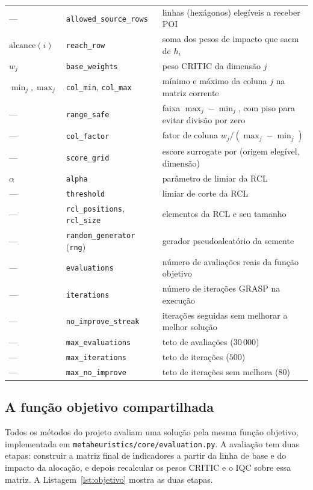\documentclass[11pt,a4paper]{article}
\newcommand{\code}[1]{\texttt{#1}}
\begin{document}
\begin{longtable}{@{}p{2.4cm} p{4.2cm} p{7.6cm}@{}}
--- & \code{allowed\_source\_rows} & linhas (hexágonos) elegíveis a receber POI \\
$\text{alcance}(i)$ & \code{reach\_row} & soma dos pesos de impacto que saem de $h_i$ \\
$w_j$ & \code{base\_weights} & peso CRITIC da dimensão $j$ \\
$\min_j,\max_j$ & \code{col\_min}, \code{col\_max} & mínimo e máximo da coluna $j$ na matriz corrente \\
--- & \code{range\_safe} & faixa $\max_j-\min_j$, com piso para evitar divisão por zero \\
--- & \code{col\_factor} & fator de coluna $w_j/(\max_j-\min_j)$ \\
--- & \code{score\_grid} & escore surrogate por (origem elegível, dimensão) \\
$\alpha$ & \code{alpha} & parâmetro de limiar da RCL \\
--- & \code{threshold} & limiar de corte da RCL \\
--- & \code{rcl\_positions}, \code{rcl\_size} & elementos da RCL e seu tamanho \\
--- & \code{random\_generator} (\code{rng}) & gerador pseudoaleatório da semente \\
--- & \code{evaluations} & número de avaliações reais da função objetivo \\
--- & \code{iterations} & número de iterações GRASP na execução \\
--- & \code{no\_improve\_streak} & iterações seguidas sem melhorar a melhor solução \\
--- & \code{max\_evaluations} & teto de avaliações ($30\,000$) \\
--- & \code{max\_iterations} & teto de iterações ($500$) \\
--- & \code{max\_no\_improve} & teto de iterações sem melhora ($80$) \\
\bottomrule
\end{longtable}

\subsection{A função objetivo compartilhada}

Todos os métodos do projeto avaliam uma solução pela mesma função objetivo, implementada em \code{metaheuristics/core/evaluation.py}. A avaliação tem duas etapas: construir a matriz final de indicadores a partir da linha de base e do impacto da alocação, e depois recalcular os pesos CRITIC e o IQC sobre essa matriz. A Listagem~\ref{lst:objetivo} mostra as duas etapas.
\end{document}

